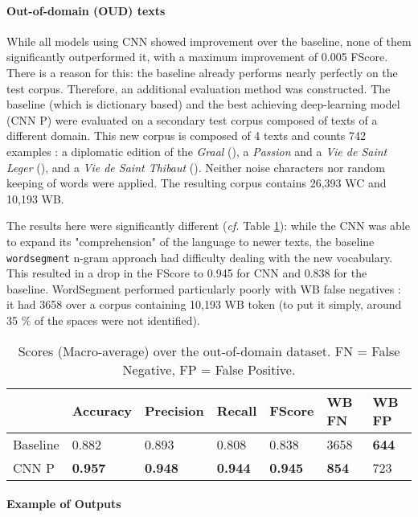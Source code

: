\documentclass{jdmdh}
\begin{document}
\paragraph{Out-of-domain (OUD) texts}

While all models using CNN showed improvement over the baseline, none of them significantly outperformed it, with a maximum improvement of 0.005 FScore. There is a reason for this: the baseline already performs nearly perfectly on the test corpus. Therefore, an additional evaluation method was constructed. The baseline (which is dictionary based) and the best achieving deep-learning model (CNN P) were evaluated on a secondary test corpus composed of texts of a different domain. This new corpus is composed of 4 texts and counts 742 examples : a diplomatic edition of the \textit{Graal} (\citet{graal}), a \textit{Passion} and a \textit{Vie de Saint Leger}  (\citet{old_french_corpus}), and a \textit{Vie de Saint Thibaut} (\citet{theobaldus}). Neither noise characters nor random keeping of words were applied. The resulting corpus contains 26,393 WC and 10,193 WB.

The results here were significantly different (\textit{cf.} Table \ref{tab:scores_unknown}): while the CNN was able to expand its "comprehension" of the language to newer texts, the baseline \texttt{wordsegment} n-gram approach had difficulty dealing with the new vocabulary. This resulted in a drop in the FScore to 0.945 for CNN and 0.838 for the baseline. WordSegment performed particularly poorly with WB false negatives : it had 3658 over a corpus containing 10,193 WB token (to put it simply, around 35 \% of the spaces were not identified).

\begin{table}[!ht]
\centering
\begin{tabular}{lllllll}
\hline
 & Accuracy & Precision & Recall & FScore & WB FN & WB FP \\ \hline
Baseline & 0.882 & 0.893 & 0.808 & 0.838 & 3658 & \textbf{644} \\
CNN P & \textbf{0.957} & \textbf{0.948} & \textbf{0.944} & \textbf{0.945} & \textbf{854} & 723 \\ \hline
\end{tabular}
\caption{Scores (Macro-average) over the out-of-domain dataset. FN = False Negative, FP = False Positive.}
\label{tab:scores_unknown}
\end{table}

\paragraph{Example of Outputs}
\end{document}
